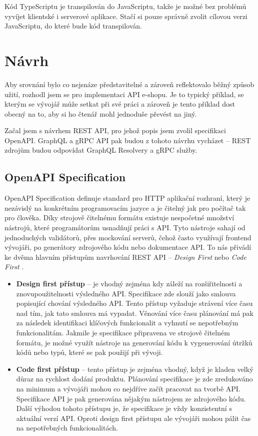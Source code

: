 \documentclass[thesis=M,czech]{FITthesis}[2019/12/23]
\begin{document}
Kód TypeScriptu je transpilován do JavaScriptu, takže je možné bez problémů vyvíjet klientské i serverové aplikace. Stačí si pouze správně zvolit cílovou verzi JavaScriptu, do které bude kód transpilován.

\chapter{Návrh}
Aby srovnání bylo co nejsnáze představitelné a zároveň reflektovalo běžný způsob užití, rozhodl jsem se pro implementaci API e-shopu. Je to typický příklad, se kterým se vývojář může setkat při své práci a zároveň je tento příklad dost obecný na to, aby si ho čtenář mohl jednoduše převést na jiný. 

Začal jsem s návrhem REST API, pro jehož popis jsem zvolil specifikaci OpenAPI. GraphQL a gRPC API pak budou z tohoto návrhu vycházet -- REST zdrojům budou odpovídat GraphQL Resolvery a gRPC služby.

\section{OpenAPI Specification}
OpenAPI Specification definuje standard pro HTTP aplikační rozhraní, který je nezávislý na konkrétním programovacím jazyce a je čitelný jak pro počítač tak pro člověka.
Díky strojově čitelnému formátu existuje nespočetné množství nástrojů, které programátorům usnadňují práci s API. Tyto nástroje sahají od jednoduchých validátorů, přes mockování serverů, čehož často využívají frontend vývojáři, po generátory zdrojového kódu nebo dokumentace API. To nás přivádí ke dvěma hlavním přístupům navrhování REST API -- \textit{Design First} nebo \textit{Code First} \cite{api_design_approach}.

\begin{itemize}
  \item \textbf{Design first přístup} -- je vhodný zejména kdy záleží na rozšiřitelnosti a znovupoužitelnosti výsledného API. Specifikace zde slouží jako smlouva popisující chování výsledného API. Tento přístup vyžaduje strávení více času nad tím, jak tato smlouva má vypadat. Věnování více času plánování má pak za následek identifikaci klíčových funkcionalit a vyhnutí se nepotřebným funkcionalitám. Jakmile je specifikace připravena ve strojově čitelném formátu, je možné využít nástroje na generování kódu k vygenerování útržků kódů nebo typů, které se pak použijí při vývoji.
  \item \textbf{Code first přístup} -- tento přístup je zejména vhodný, když je kladen velký důraz na rychlost dodání produktu. Plánování specifikace je zde zredukováno na minimum a vývojáři mohou co nejdříve začít pracovat na tvorbě API. Specifikace API je pak generována nějakým nástrojem ze zdrojového kódu. Další výhodou tohoto přístupu je, že specifikace je vždy konzistentní s aktuální verzí API. Oproti design first přístupu ale vývojáři mohou pálit čas na nepotřebných funkcionalitách.
\end{itemize}
\end{document}
